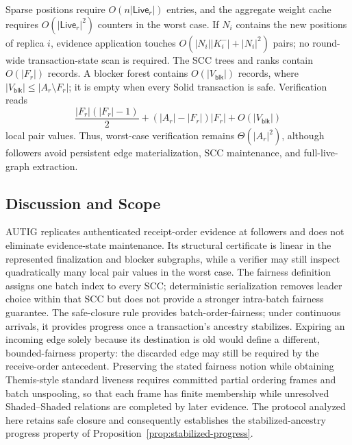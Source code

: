 Sparse positions require $O(n|\mathsf{Live}_r|)$ entries, and the aggregate
weight cache requires $O(|\mathsf{Live}_r|^2)$ counters in the worst case.  If
$N_i$ contains the new positions of replica $i$, evidence application touches
$O(|N_i||K_i^-|+|N_i|^2)$ pairs; no round-wide transaction-state scan is
required.  The SCC trees and ranks contain $O(|F_r|)$ records.  A blocker
forest contains $O(|V_{\mathsf{blk}}|)$ records, where
$|V_{\mathsf{blk}}|\le|A_r\setminus F_r|$; it is empty when every Solid
transaction is safe.  Verification reads
\[
 \frac{|F_r|(|F_r|-1)}{2}
 +( |A_r|-|F_r| )|F_r|+O(|V_{\mathsf{blk}}|)
\]
local pair values.  Thus, worst-case verification remains
$\Theta(|A_r|^2)$, although followers avoid persistent edge materialization,
SCC maintenance, and full-live-graph extraction.

\subsection{Discussion and Scope}
\label{sec:discussion-scope}

AUTIG replicates authenticated receipt-order evidence at followers and does
not eliminate evidence-state maintenance.  Its structural certificate is
linear in the represented finalization and blocker subgraphs, while a verifier
may still inspect quadratically many local pair values in the worst case.  The
fairness definition assigns one batch index to every SCC; deterministic
serialization removes leader choice within that SCC but does not provide a
stronger intra-batch fairness guarantee.  The safe-closure rule provides
batch-order-fairness; under continuous arrivals, it provides progress once a
transaction's ancestry stabilizes.  Expiring an incoming edge solely because
its destination is old would define a different, bounded-fairness property: the
discarded edge may still be required by the receive-order antecedent.  Preserving
the stated fairness notion while obtaining Themis-style standard liveness
requires committed partial ordering frames and batch unspooling, so that each
frame has finite membership while unresolved Shaded--Shaded relations are
completed by later evidence.  The protocol analyzed here retains safe closure
and consequently establishes the stabilized-ancestry progress property of
Proposition~\ref{prop:stabilized-progress}.

\appendices
